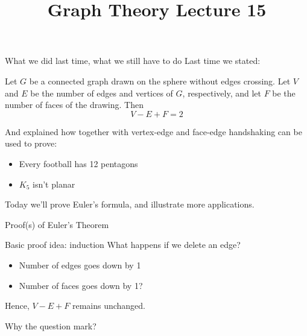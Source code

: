 \documentclass{beamer}
\title{Graph Theory Lecture 15}
\begin{document}
\begin{frame}{What we did last time, what we still have to do}
Last time we stated:
   \begin{theorem}
    Let $G$ be a \alert{connected} graph drawn on the sphere without edges crossing.  Let $V$ and $E$ be the number of edges and vertices of $G$, respectively, and let $F$ be the number of faces of the drawing.  Then
    $$V-E+F=2$$
    \end{theorem}
   And explained how together with vertex-edge and face-edge handshaking can be used to prove:
   \begin{itemize}
   \item Every football has 12 pentagons
   \item $K_5$ isn't planar
   \end{itemize}
Today we'll prove Euler's formula, and illustrate more applications.
   \end{frame}

\begin{frame}{Proof(s) of Euler's Theorem }
\begin{block}{Basic proof idea: induction}
  What happens if we delete an edge?

  \begin{itemize}
  \item Number of edges goes down by 1
  \item Number of faces goes down by 1?
  \end{itemize}

  Hence, $V-E+F$ remains unchanged.
\end{block}

\begin{block}{Why the question mark?}
\end{block}
  \end{frame}
\end{document}
